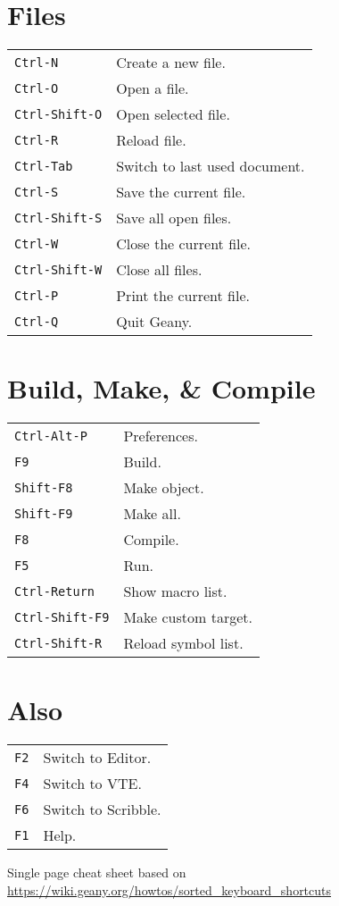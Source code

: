 \begin{multicols}{3}
\section{Files}
\begin{tabular}{@{}ll@{}}
	\verb!Ctrl-N! & Create a new file. \\
	\verb!Ctrl-O! & Open a file. \\
	\verb!Ctrl-Shift-O! & Open selected file. \\
	\verb!Ctrl-R! & Reload file. \\
	\verb!Ctrl-Tab! & Switch to last used document. \\
	\verb!Ctrl-S! & Save the current file. \\
	\verb!Ctrl-Shift-S! & Save all open files. \\
	\verb!Ctrl-W! & Close the current file. \\
	\verb!Ctrl-Shift-W! & Close all files. \\
	\verb!Ctrl-P! & Print the current file. \\
	\verb!Ctrl-Q! & Quit Geany. \\
\end{tabular}

\section{Build, Make, \& Compile}
\begin{tabular}{@{}ll@{}}
	\verb!Ctrl-Alt-P! & Preferences. \\
	\verb!F9! & Build. \\
	\verb!Shift-F8! & Make object. \\
	\verb!Shift-F9! & Make all. \\
	\verb!F8! & Compile. \\
	\verb!F5! & Run. \\
	\verb!Ctrl-Return! & Show macro list. \\
	\verb!Ctrl-Shift-F9! & Make custom target. \\
	\verb!Ctrl-Shift-R! & Reload symbol list. \\
\end{tabular}

\section{Also}
\begin{tabular}{@{}ll@{}}
	\verb!F2! & Switch to Editor. \\
	\verb!F4! & Switch to VTE. \\
	\verb!F6! & Switch to Scribble. \\
	\verb!F1! & Help. \\
\end{tabular}

Single page cheat sheet based on \url{https://wiki.geany.org/howtos/sorted_keyboard_shortcuts}

\end{multicols}

